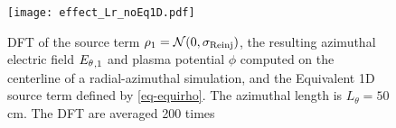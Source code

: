       \begin{figure}[hbt]
        \centering
        \texttt{[image: effect\_Lr\_noEq1D.pdf]}
        \caption{ DFT of the source term $\rho_1 = \mathcal{N}(0, \sigma_{\rm Reinj})$, the resulting azimuthal electric field ${E_{\theta}}_{, 1}$ and plasma potential $\phi$ computed on the centerline of a radial-azimuthal simulation, and the Equivalent \acs{1D} source term defined by \cref{eq-equirho}. The azimuthal length is $L_{\theta}=50$ cm. The \acs{DFT} are averaged 200 times  }
        \label{fig-dftLr}
        
      \end{figure}




